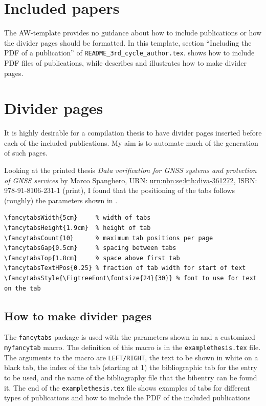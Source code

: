 \documentclass[12pt, twoside]{article}
\begin{document}
\section{Included papers}
\label{sec:cycle3IncludedPapers}
The AW-template provides no guidance about how to include publications or how the divider pages should be formatted. In this template, section ``Including the PDF of a publication'' of \texttt{README\_3rd\_cycle\_author.tex}. shows how to include PDF files of publications, while  describes and illustrates how to make divider pages.


\section{Divider pages}
\label{sec:cycle3DividerPages}

It is highly desirable for a compilation thesis to have divider pages inserted before each of the included publications. My aim is to automate much of the generation of such pages.

Looking at the printed thesis \textit{Data verification for GNSS systems and protection of GNSS services} by Marco Spanghero, URN: \href{https://urn.kb.se/resolve?urn=urn%3Anbn%3Ase%3Akth%3Adiva-361272}{urn:nbn:se:kth:diva-361272}, ISBN: 978-91-8106-231-1 (print), I found that the positioning of the tabs follows (roughly) the parameters shown in \Cref{lst:myfancytabParameters}.

\begin{lstlisting}[style=latexExampleForAuthors, caption={Parameters used with myfancytab macro}, label=lst:myfancytabParameters]
\fancytabsWidth{5cm}     % width of tabs
\fancytabsHeight{1.9cm}  % height of tab
\fancytabsCount{10}      % maximum tab positions per page
\fancytabsGap{0.5cm}     % spacing between tabs
\fancytabsTop{1.8cm}     % space above first tab
\fancytabsTextHPos{0.25} % fraction of tab width for start of text
\fancytabsStyle{\FigtreeFont\fontsize{24}{30}} % font to use for text on the tab
\end{lstlisting}

\subsection{How to make divider pages}
\label{sec:cycle3HowToMakeDividerPages}

The \texttt{fancytabs} package is used with the parameters shown in 
and a customized \texttt{myfancytab} macro. The definition of this macro is in the \texttt{examplethesis.tex} file. The arguments to the macro are \texttt{LEFT/RIGHT}, the text to be shown in white on a black tab, the index of the tab (starting at 1) the bibliographic tab for the entry to be used, and the name of the bibliography file that the bibentry can be found it. The end of the \texttt{examplethesis.tex} file shows examples of tabs for different types of publications and how to include the PDF of the included publications
\end{document}
